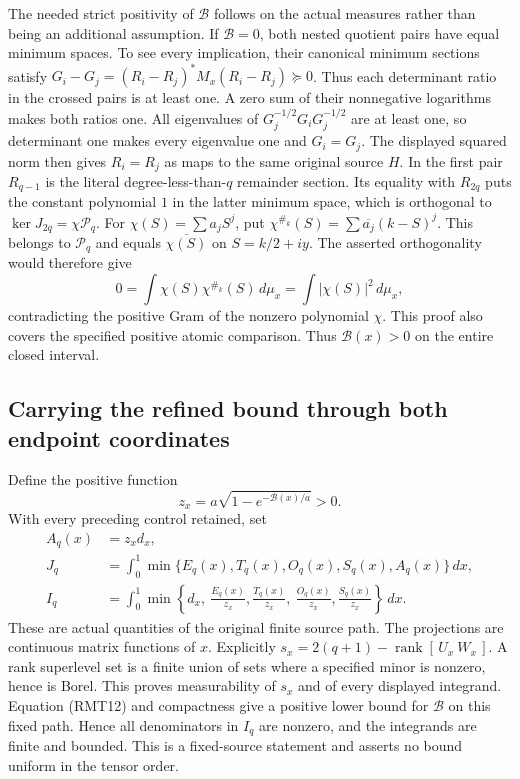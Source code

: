 The needed strict positivity of \(\mathcal B\) follows on the
actual measures rather than being an additional assumption.
If \(\mathcal B=0\), both nested quotient pairs have equal
minimum spaces.  To see every implication, their canonical
minimum sections satisfy
\(G_i-G_j=(R_i-R_j)^*M_x(R_i-R_j)\succeq0\).
Thus each determinant ratio in the crossed pairs is at least
one.  A zero sum of their nonnegative logarithms makes both
ratios one.  All eigenvalues of \(G_j^{-1/2}G_iG_j^{-1/2}\)
are at least one, so determinant one makes every eigenvalue
one and \(G_i=G_j\).  The displayed squared norm then gives
\(R_i=R_j\) as maps to the same original source \(H\).
In the first pair \(R_{q-1}\) is the literal degree-less-than-\(q\)
remainder section.  Its equality with \(R_{2q}\) puts the
constant polynomial \(1\) in the latter minimum space,
which is orthogonal to \(\ker J_{2q}=\chi\mathcal P_q\).
For \(\chi(S)=\sum a_jS^j\), put
\(\chi^{\#_k}(S)=\sum\overline{a_j}(k-S)^j\).
This belongs to \(\mathcal P_q\) and equals
\(\overline{\chi(S)}\) on \(S=k/2+iy\).  The asserted
orthogonality would therefore give
\[
 0=\int\chi(S)\chi^{\#_k}(S)\,d\mu_x
   =\int|\chi(S)|^2\,d\mu_x,
 \tag{RMT12}
\]
contradicting the positive Gram of the nonzero polynomial
\(\chi\).  This proof also covers the specified positive
atomic comparison.  Thus \(\mathcal B(x)>0\) on the entire
closed interval.

\subsection{Carrying the refined bound through both endpoint coordinates}

Define the positive function
\[
 z_x=a\sqrt{1-e^{-\mathcal B(x)/a}}>0.
\]
With every preceding control retained, set
\[
 \begin{split}
 A_q(x)&=z_xd_x,\\
 J_q&=\int_0^1\min\{E_q(x),T_q(x),O_q(x),S_q(x),A_q(x)\}\,dx,\\
 I_q&=\int_0^1\min\left\{d_x,\
 \frac{E_q(x)}{z_x},\frac{T_q(x)}{z_x},\
 \frac{O_q(x)}{z_x},\frac{S_q(x)}{z_x}\right\}\,dx .
 \end{split}
 \tag{RMT13}
\]
These are actual quantities of the original finite source path.
The projections are continuous matrix functions of \(x\).
Explicitly \(s_x=2(q+1)-\operatorname{rank}[\,U_x\ W_x\,]\).
A rank superlevel set is a finite union of sets where a
specified minor is nonzero, hence is Borel.  This proves
measurability of \(s_x\) and of every displayed integrand.
Equation (RMT12)
and compactness give a positive lower bound for \(\mathcal B\)
on this fixed path.  Hence all denominators in \(I_q\) are
nonzero, and the integrands are finite and bounded.  This is
a fixed-source statement and asserts no bound uniform in
the tensor order.

